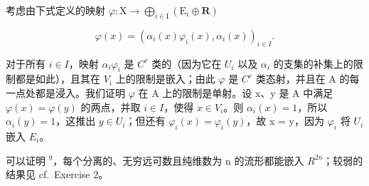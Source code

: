 考虑由下式定义的映射 \(\varphi : \mathrm{X} \to \bigoplus_{i \in \mathrm{I}} (\mathrm{E}_i \oplus \mathbf{R})\)

\[
\varphi (x) = (\alpha_ {i} (x) \varphi_ {i} (x), \alpha_ {i} (x)) _ {i \in I}.
\]

对于所有 \(i \in I\)，映射 \(\alpha_{i}\varphi_{i}\) 是 \(C^{r}\) 类的（因为它在 \(U_{i}\) 以及 \(\alpha_{i}\) 的支集的补集上的限制都是如此），且其在 \(V_{i}\) 上的限制是嵌入；由此 \(\varphi\) 是 \(C^{r}\) 类态射，并且在 A 的每一点处都是浸入。我们证明 \(\varphi\) 在 A 上的限制是单射。设 x、y 是 A 中满足 \(\varphi(x) = \varphi(y)\) 的两点，并取 \(i \in I\)，使得 \(x \in V_{i}\)。则 \(\alpha_{i}(x) = 1\)，所以 \(\alpha_{i}(y) = 1\)，这推出 \(y \in U_{i}\)；但还有 \(\varphi_{i}(x) = \varphi_{i}(y)\)，故 x = y，因为 \(\varphi_{i}\) 将 \(U_{i}\) 嵌入 \(E_{i}\)。

可以证明 \(^{9}\)，每个分离的、无穷远可数且纯维数为 n 的流形都能嵌入 \(R^{2n}\)；较弱的结果见 cf.~Exercise 2。

